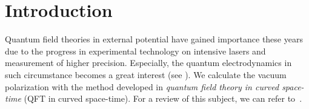 \section{Introduction}
Quantum field theories in external potential have gained importance these years due to the progress in experimental technology on intensive lasers and measurement of higher precision.
Especially, the quantum electrodynamics in such circumstance becomes a great interest (see \eg\cite{Mohr1998}). 
%
We calculate the vacuum polarization with the method developed in \textit{quantum field theory in curved space-time} (QFT in curved space-time). 
For a review of this subject, we can refer to~\cite{Hollands2014}. \\\\
%
